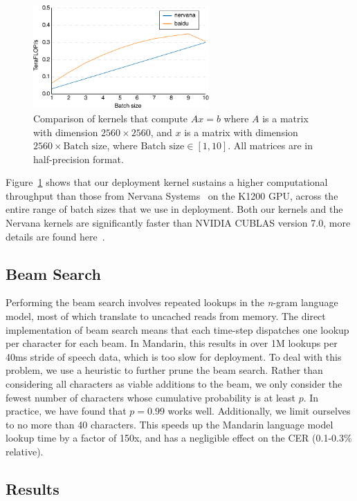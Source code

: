 \begin{figure}
\centering
\includegraphics[width=0.6\textwidth]{deepspeech2/figures/hgemm.pdf}
    \caption{Comparison of kernels that compute $A x = b$ where $A$ is a matrix
    with dimension $2560 \times 2560$, and $x$ is a matrix with dimension $2560
    \times \textrm{Batch size}$, where $\textrm{Batch size} \in [1, 10]$. All
    matrices are in half-precision format.}
\label{fig:deepspeech2:hgemm}
\end{figure}

Figure~\ref{fig:deepspeech2:hgemm} shows that our deployment kernel sustains a higher
computational throughput than those from Nervana Systems~\cite{nervana2015} on
the K1200 GPU, across the entire range of batch sizes that we use in
deployment. Both our kernels and the Nervana kernels are significantly faster
than NVIDIA CUBLAS version 7.0, more details are found here~\cite{elsen2015}.

\subsection{Beam Search}

Performing the beam search involves repeated lookups in the \emph{n}-gram
language model, most of which translate to uncached reads from memory. The
direct implementation of beam search means that each time-step dispatches one
lookup per character for each beam. In Mandarin, this results in over 1M
lookups per 40ms stride of speech data, which is too slow for deployment. To
deal with this problem, we use a heuristic to further prune the beam search.
Rather than considering all characters as viable additions to the beam, we only
consider the fewest number of characters whose cumulative probability is at
least $p$. In practice, we have found that $p=0.99$ works well. Additionally,
we limit ourselves to no more than 40 characters. This speeds up the Mandarin
language model lookup time by a factor of 150x, and has a negligible effect on
the CER (0.1-0.3\% relative).

\subsection{Results}

